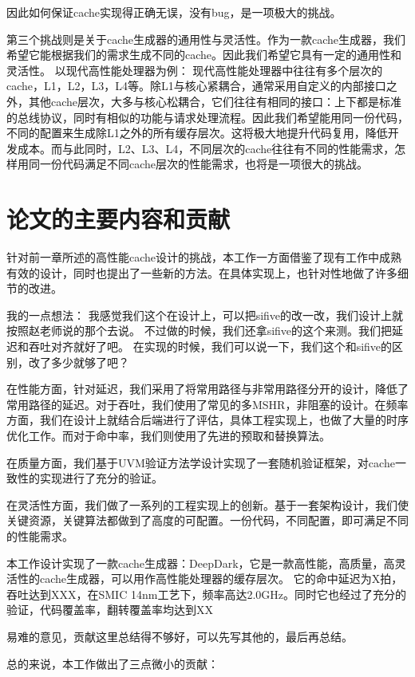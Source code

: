 因此如何保证cache实现得正确无误，没有bug，是一项极大的挑战。

第三个挑战则是关于cache生成器的通用性与灵活性。作为一款cache生成器，我们希望它能根据我们的需求生成不同的cache。因此我们希望它具有一定的通用性和灵活性。
以现代高性能处理器为例： 现代高性能处理器中往往有多个层次的cache，L1，L2，L3，L4等。除L1与核心紧耦合，通常采用自定义的内部接口之外，其他cache层次，大多与核心松耦合，它们往往有相同的接口：上下都是标准的总线协议，同时有相似的功能与请求处理流程。因此我们希望能用同一份代码，不同的配置来生成除L1之外的所有缓存层次。这将极大地提升代码复用，降低开发成本。而与此同时，L2、L3、L4，不同层次的cache往往有不同的性能需求，怎样用同一份代码满足不同cache层次的性能需求，也将是一项很大的挑战。

\section{论文的主要内容和贡献}

针对前一章所述的高性能cache设计的挑战，本工作一方面借鉴了现有工作中成熟有效的设计，同时也提出了一些新的方法。在具体实现上，也针对性地做了许多细节的改进。

我的一点想法：
我感觉我们这个在设计上，可以把sifive的改一改，我们设计上就按照赵老师说的那个去说。
不过做的时候，我们还拿sifive的这个来测。我们把延迟和吞吐对齐就好了吧。
在实现的时候，我们可以说一下，我们这个和sifive的区别，改了多少就够了吧？

在性能方面，针对延迟，我们采用了将常用路径与非常用路径分开的设计，降低了常用路径的延迟。对于吞吐，我们使用了常见的多MSHR，非阻塞的设计。在频率方面，我们在设计上就结合后端进行了评估，具体工程实现上，也做了大量的时序优化工作。而对于命中率，我们则使用了先进的预取和替换算法。

在质量方面，我们基于UVM验证方法学设计实现了一套随机验证框架，对cache一致性的实现进行了充分的验证。

在灵活性方面，我们做了一系列的工程实现上的创新。基于一套架构设计，我们使关键资源，关键算法都做到了高度的可配置。一份代码，不同配置，即可满足不同的性能需求。

本工作设计实现了一款cache生成器：DeepDark，它是一款高性能，高质量，高灵活性的cache生成器，可以用作高性能处理器的缓存层次。
它的命中延迟为X拍，吞吐达到XXX，在SMIC 14nm工艺下，频率高达2.0GHz。同时它也经过了充分的验证，代码覆盖率，翻转覆盖率均达到XX%


易难的意见，贡献这里总结得不够好，可以先写其他的，最后再总结。

总的来说，本工作做出了三点微小的贡献：


